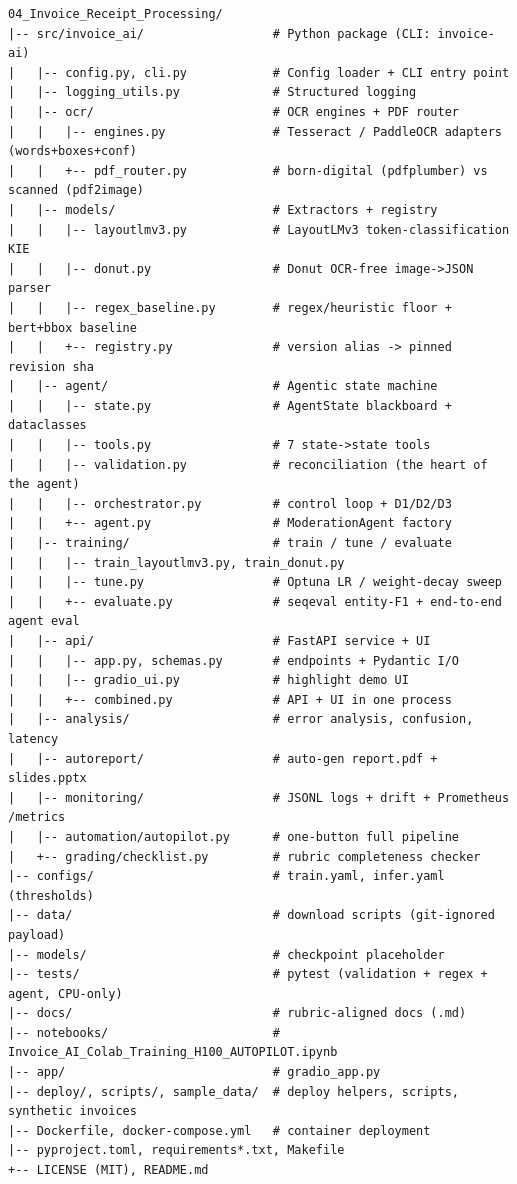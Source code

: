 \documentclass[12pt,a4paper]{article}
\begin{document}
\begin{lstlisting}[basicstyle=\ttfamily\footnotesize]
04_Invoice_Receipt_Processing/
|-- src/invoice_ai/                  # Python package (CLI: invoice-ai)
|   |-- config.py, cli.py            # Config loader + CLI entry point
|   |-- logging_utils.py             # Structured logging
|   |-- ocr/                         # OCR engines + PDF router
|   |   |-- engines.py               # Tesseract / PaddleOCR adapters (words+boxes+conf)
|   |   +-- pdf_router.py            # born-digital (pdfplumber) vs scanned (pdf2image)
|   |-- models/                      # Extractors + registry
|   |   |-- layoutlmv3.py            # LayoutLMv3 token-classification KIE
|   |   |-- donut.py                 # Donut OCR-free image->JSON parser
|   |   |-- regex_baseline.py        # regex/heuristic floor + bert+bbox baseline
|   |   +-- registry.py              # version alias -> pinned revision sha
|   |-- agent/                       # Agentic state machine
|   |   |-- state.py                 # AgentState blackboard + dataclasses
|   |   |-- tools.py                 # 7 state->state tools
|   |   |-- validation.py            # reconciliation (the heart of the agent)
|   |   |-- orchestrator.py          # control loop + D1/D2/D3
|   |   +-- agent.py                 # ModerationAgent factory
|   |-- training/                    # train / tune / evaluate
|   |   |-- train_layoutlmv3.py, train_donut.py
|   |   |-- tune.py                  # Optuna LR / weight-decay sweep
|   |   +-- evaluate.py              # seqeval entity-F1 + end-to-end agent eval
|   |-- api/                         # FastAPI service + UI
|   |   |-- app.py, schemas.py       # endpoints + Pydantic I/O
|   |   |-- gradio_ui.py             # highlight demo UI
|   |   +-- combined.py              # API + UI in one process
|   |-- analysis/                    # error analysis, confusion, latency
|   |-- autoreport/                  # auto-gen report.pdf + slides.pptx
|   |-- monitoring/                  # JSONL logs + drift + Prometheus /metrics
|   |-- automation/autopilot.py      # one-button full pipeline
|   +-- grading/checklist.py         # rubric completeness checker
|-- configs/                         # train.yaml, infer.yaml (thresholds)
|-- data/                            # download scripts (git-ignored payload)
|-- models/                          # checkpoint placeholder
|-- tests/                           # pytest (validation + regex + agent, CPU-only)
|-- docs/                            # rubric-aligned docs (.md)
|-- notebooks/                       # Invoice_AI_Colab_Training_H100_AUTOPILOT.ipynb
|-- app/                             # gradio_app.py
|-- deploy/, scripts/, sample_data/  # deploy helpers, scripts, synthetic invoices
|-- Dockerfile, docker-compose.yml   # container deployment
|-- pyproject.toml, requirements*.txt, Makefile
+-- LICENSE (MIT), README.md
\end{lstlisting}
\end{document}
